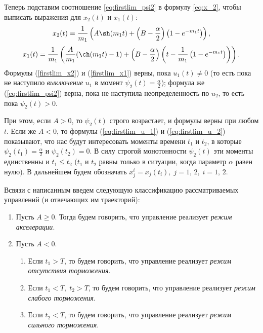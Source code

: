 Теперь подставим соотношение \eqref{eq:firstlim_psi2} в формулу \eqref{eq:x_2}, чтобы выписать выражения для $x_2(t)$ и $x_1(t)$:
\begin{equation}\label{firstlim_x2}
        x_2(t) = \frac{1}{m_1} \left( A \sh(m_1 t) + \left( B - \frac{\alpha}{2}\right)\left( 1 - e^{-m_1t}\right)\right),
\end{equation}
\begin{equation}\label{firstlim_x1}
        x_1(t) = \frac{1}{m_1} \left(\frac{A}{m_1} (\ch(m_1t) - 1) + \left( B - \frac{\alpha}{2}\right)\left(t - \frac{1}{m_1}\left( 1 - e^{-m_1 t}\right)\right)\right).
\end{equation}
Формулы (\ref{firstlim_x2}) и (\ref{firstlim_x1}) верны, пока $u_1(t) \neq 0$ (то есть пока не наступило \textit{выключение} $u_1$ в момент $\psi_2(t) = \frac{\alpha}{2}$); формула же (\ref{eq:firstlim_psi2}) верна, пока не наступила неопределенность по $u_2$, то есть пока $\psi_2(t) > 0$. 

При этом, если $A > 0$, то $\psi_2(t)$ строго возрастает, и формулы верны при любом $t$. Если же $A < 0$, то формулы (\ref{eq:firstlim_u_1}) и (\ref{eq:firstlim_u_2}) показывают, что нас будут интересовать моменты времени $t_1$ и $t_2$, в которые $\psi_2(t_1) = \frac{\alpha}{2}$ и $\psi_2(t_2) = 0$. В силу строгой монотонности $\psi_2(t)$ эти моменты единственны и $t_1 \leqslant t_2$ ($t_1$ и $t_2$ равны только в ситуации, когда параметр $\alpha$ равен нулю). В дальнейшем будем обозначать $x_j^i = x_j(t_i),\; j=1,\,2,\;i=1,\,2$.

Всвязи с написанным введем следующую классификацию рассматриваемых управлений (и отвечающих им траекторий):
\begin{enumerate}
        \item Пусть $A \geqslant 0$. Тогда будем говорить, что управление реализует \textit{режим акселерации}.
        \item Пусть $A < 0$.
        \begin{enumerate}
                \item Если $t_1 > T$, то будем говорить, что управление реализует \textit{режим отсутствия торможения}.
                \item Если $t_1 < T, \; t_2 > T$, то будем говорить, что управление реализует \textit{режим слабого торможения}.
                \item Если $t_2 < T$, то будем говорить, что управление реализует \textit{режим сильного торможения}.
        \end{enumerate}
\end{enumerate}

